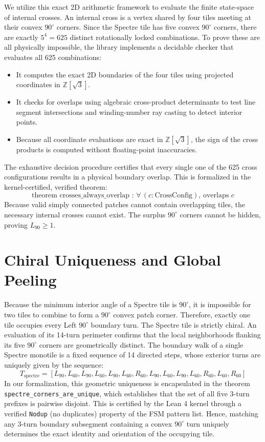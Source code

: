 \documentclass[11pt, a4paper]{amsart}
\begin{document}
We utilize this exact 2D arithmetic framework to evaluate the finite state-space of internal crosses. An internal cross is a vertex shared by four tiles meeting at their convex $90^\circ$ corners. Since the Spectre tile has five convex $90^\circ$ corners, there are exactly $5^4 = 625$ distinct rotationally locked combinations. To prove these are all physically impossible, the library implements a decidable checker that evaluates all 625 combinations:
\begin{itemize}
    \item It computes the exact 2D boundaries of the four tiles using projected coordinates in $\mathbb{Z}[\sqrt{3}]$.
    \item It checks for overlaps using algebraic cross-product determinants to test line segment intersections and winding-number ray casting to detect interior points.
    \item Because all coordinate evaluations are exact in $\mathbb{Z}[\sqrt{3}]$, the sign of the cross products is computed without floating-point inaccuracies.
\end{itemize}
The exhaustive decision procedure certifies that every single one of the 625 cross configurations results in a physical boundary overlap. This is formalized in the kernel-certified, verified theorem:
\begin{equation}
\text{theorem crosses\_always\_overlap : } \forall \, (c : \text{CrossConfig}), \, \text{overlaps } c
\end{equation}
Because valid simply connected patches cannot contain overlapping tiles, the necessary internal crosses cannot exist. The surplus $90^\circ$ corners cannot be hidden, proving $L_{90} \ge 1$.

\section{Chiral Uniqueness and Global Peeling}
Because the minimum interior angle of a Spectre tile is $90^\circ$, it is impossible for two tiles to combine to form a $90^\circ$ convex patch corner. Therefore, exactly one tile occupies every Left $90^\circ$ boundary turn.
The Spectre tile is strictly chiral. An evaluation of its 14-turn perimeter confirms that the local neighborhoods flanking its five $90^\circ$ corners are geometrically distinct. The boundary walk of a single Spectre monotile is a fixed sequence of 14 directed steps, whose exterior turns are uniquely given by the sequence:
\begin{equation}
T_{\text{spectre}} = [L_{90}, L_{60}, L_{90}, L_{60}, L_{90}, L_{60}, R_{60}, L_{90}, L_{60}, L_{90}, L_{60}, R_{60}, L_{60}, R_{60}]
\end{equation}
In our formalization, this geometric uniqueness is encapsulated in the theorem \texttt{spectre\_corners\_are\_unique}, which establishes that the set of all five 3-turn prefixes is pairwise disjoint. This is certified by the Lean 4 kernel through a verified \texttt{Nodup} (no duplicates) property of the FSM pattern list. Hence, matching any 3-turn boundary subsegment containing a convex $90^\circ$ turn uniquely determines the exact identity and orientation of the occupying tile.
\end{document}
